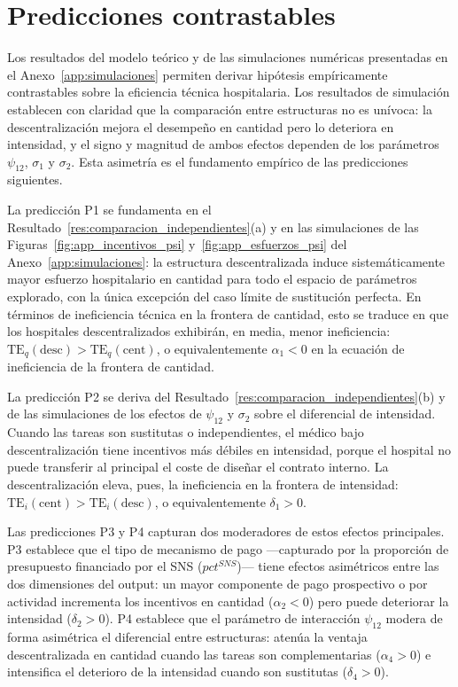 \documentclass[12pt, a4paper, twoside, openright]{book}
\theoremstyle{plain}
\theoremstyle{definition}
\theoremstyle{remark}
\begin{document}
\section{Predicciones contrastables}
\label{sec:predicciones}

Los resultados del modelo teórico y de las simulaciones numéricas presentadas en el Anexo~\ref{app:simulaciones} permiten derivar hipótesis empíricamente contrastables sobre la eficiencia técnica hospitalaria. Los resultados de simulación establecen con claridad que la comparación entre estructuras no es unívoca: la descentralización mejora el desempeño en cantidad pero lo deteriora en intensidad, y el signo y magnitud de ambos efectos dependen de los parámetros $\psi_{12}$, $\sigma_1$ y $\sigma_2$. Esta asimetría es el fundamento empírico de las predicciones siguientes.

La predicción P1 se fundamenta en el Resultado~\ref{res:comparacion_independientes}(a) y en las simulaciones de las Figuras~\ref{fig:app_incentivos_psi} y~\ref{fig:app_esfuerzos_psi} del Anexo~\ref{app:simulaciones}: la estructura descentralizada induce sistemáticamente mayor esfuerzo hospitalario en cantidad para todo el espacio de parámetros explorado, con la única excepción del caso límite de sustitución perfecta. En términos de ineficiencia técnica en la frontera de cantidad, esto se traduce en que los hospitales descentralizados exhibirán, en media, menor ineficiencia: $\mathrm{TE}_q(\text{desc})>\mathrm{TE}_q(\text{cent})$, o equivalentemente $\alpha_1<0$ en la ecuación de ineficiencia de la frontera de cantidad.

La predicción P2 se deriva del Resultado~\ref{res:comparacion_independientes}(b) y de las simulaciones de los efectos de $\psi_{12}$ y $\sigma_2$ sobre el diferencial de intensidad. Cuando las tareas son sustitutas o independientes, el médico bajo descentralización tiene incentivos más débiles en intensidad, porque el hospital no puede transferir al principal el coste de diseñar el contrato interno. La descentralización eleva, pues, la ineficiencia en la frontera de intensidad: $\mathrm{TE}_i(\text{cent})>\mathrm{TE}_i(\text{desc})$, o equivalentemente $\delta_1>0$.

Las predicciones P3 y P4 capturan dos moderadores de estos efectos principales. P3 establece que el tipo de mecanismo de pago ---capturado por la proporción de presupuesto financiado por el SNS ($pct^{SNS}$)--- tiene efectos asimétricos entre las dos dimensiones del output: un mayor componente de pago prospectivo o por actividad incrementa los incentivos en cantidad ($\alpha_2<0$) pero puede deteriorar la intensidad ($\delta_2>0$). P4 establece que el parámetro de interacción $\psi_{12}$ modera de forma asimétrica el diferencial entre estructuras: atenúa la ventaja descentralizada en cantidad cuando las tareas son complementarias ($\alpha_4>0$) e intensifica el deterioro de la intensidad cuando son sustitutas ($\delta_4>0$).
\end{document}

